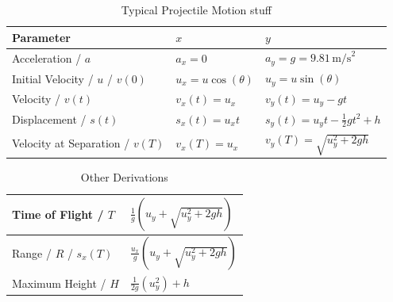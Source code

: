 \documentclass[a4paper, 12pt]{report}
\begin{document}
    
    \renewcommand{\arraystretch}{1.5}
        
        \begin{table}[H]
            \centering
            \begin{tabular}{|>{\centering\arraybackslash}p{}|>{\centering\arraybackslash}p{}|>{\centering\arraybackslash}p{}|}
                \hline
                Parameter & $x$ & $y$ \\ \hline
                Acceleration / $a$ & $a_x = 0$ & $a_y = g = 9.81 \, \text{m/s}^2$ \\ \hline
                Initial Velocity / $u$ / $v(0)$ & $u_x = u \cos(\theta)$ & $u_y = u \sin(\theta)$ \\ \hline
                Velocity / $v(t)$ & $v_x(t) = u_x$ & $v_y(t) = u_y - gt$ \\ \hline
                Displacement / $s(t)$ & $s_x(t) =  u_x t$ & $s_y(t) = u_y t - \frac{1}{2}gt^2 + h$ \\ \hline
                Velocity at Separation / $v(T)$ & $v_x(T) = u_x$ & $v_y(T) = \sqrt{u_y^2 + 2gh}$ \\ \hline
            \end{tabular}
            \caption{Typical Projectile Motion stuff}
            \label{tab:motion_parameters}
        \end{table}
       
       \begin{table}[H]
           \centering
           \begin{tabular}{|>{\centering\arraybackslash}p{}|>{\centering\arraybackslash}p{}|}\hline
                Time of Flight / $T$ & $\frac{1}{g}\left(u_y + \sqrt{u_y^2 + 2gh}\right)$ \\ \hline
                Range / $R$ / $s_x(T)$ & $\frac{u_x}{g}\left(u_y + \sqrt{u_y^2 + 2gh}\right)$ \\ \hline
                Maximum Height / $H$ & $\frac{1}{2g}\left(u_y^2\right) + h$ \\ \hline
           \end{tabular}
           \caption{Other Derivations}
           \label{tab:derivations}
       \end{table}
       
\end{document}
